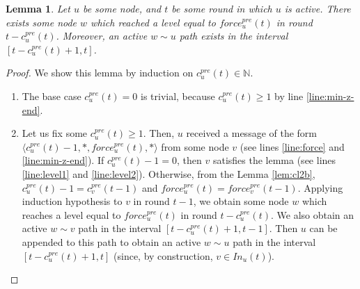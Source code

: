 \documentclass[11pt,letterpaper]{article}
\newtheorem{lem}[thm]{Lemma}
\begin{document}
\begin{lem} \label{lem:safety-force}
	Let $u$ be some node, and $t$ be some round in which $u$ is active.
	There exists some node $w$ which reached a level equal to $force_u^{pre}(t)$ in round $t-c_u^{pre}(t)$.
	Moreover, an active $w \sim u$ path exists in the interval $[t-c_u^{pre}(t)+1,t]$.
\end{lem}
\begin{proof}
	We show this lemma by induction on $c_u^{pre}(t) \in \mathds{N}$.
	\begin{enumerate}
		\item The base case $c_u^{pre}(t) = 0$ is trivial, because $c_u^{pre}(t) \geq 1$ by line \ref{line:min-z-end}.
		\item Let us fix some $c_u^{pre}(t) \geq 1$.
			Then, $u$ received a message of the form $\langle c_u^{pre}(t)-1, *, force_u^{pre}(t), * \rangle$ from some node $v$ (see lines \ref{line:force} and \ref{line:min-z-end}).
			If $c_u^{pre}(t) - 1 = 0$, then $v$ satisfies the lemma (see lines \ref{line:level1} and \ref{line:level2}).
			Otherwise, from the Lemma \ref{lem:cl2b}, $c_u^{pre}(t)-1 = c_v^{pre}(t-1)$ and $force_u^{pre}(t) = force_v^{pre}(t-1)$.
			Applying induction hypothesis to $v$ in round $t-1$, we obtain some node $w$ which reaches a level equal to $force_u^{pre}(t)$ in round $t-c_u^{pre}(t)$.
			We also obtain an active $w \sim v$ path in the interval $[t-c_u^{pre}(t)+1,t-1]$.
			Then $u$ can be appended to this path to obtain an active $w \sim u$ path in the interval $[t-c_u^{pre}(t)+1,t]$ (since, by construction, $v \in In_u(t)$).
	\end{enumerate}
\end{proof}
\end{document}
